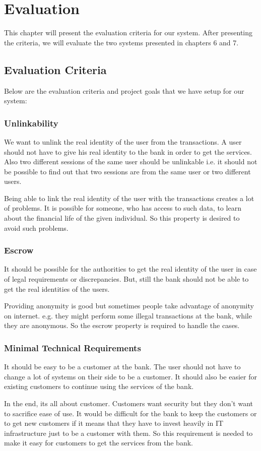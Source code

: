 \chapter{Evaluation}
This chapter will present the evaluation criteria for our system. After presenting the criteria, we will evaluate the two systems presented in chapters 6 and 7.
\section{Evaluation Criteria}
Below are the evaluation criteria and project goals that we have setup for our system:
\subsection{Unlinkability}
We want to unlink the real identity of the user from the transactions. A user should not have to give his real identity to the bank in order to get the services. Also two different sessions of the same user should be unlinkable i.e. it should not be possible to find out that two sessions are from the same user or two different users.

Being able to link the real identity of the user with the transactions creates a lot of problems. It is possible for someone, who has access to such data, to learn about the financial life of the given individual. So this property is desired to avoid such problems.
\subsection{Escrow}
It should be possible for the authorities to get the real identity of the user in case of legal requirements or discrepancies. But, still the bank should not be able to get the real identities of the users.

Providing anonymity is good but sometimes people take advantage of anonymity on internet. e.g. they might perform some illegal transactions at the bank, while they are anonymous. So the escrow property is required to handle the cases.
\subsection{Minimal Technical Requirements}
It should be easy to be a customer at the bank. The user should not have to change a lot of systems on their side to be a customer. It should also be easier for existing customers to continue using the services of the bank.

In the end, its all about customer. Customers want security but they don't want to sacrifice ease of use. It would be difficult for the bank to keep the customers or to get new customers if it means that they have to invest heavily in IT infrastructure just to be a customer with them. So this requirement is needed to make it easy for customers to get the services from the bank.
